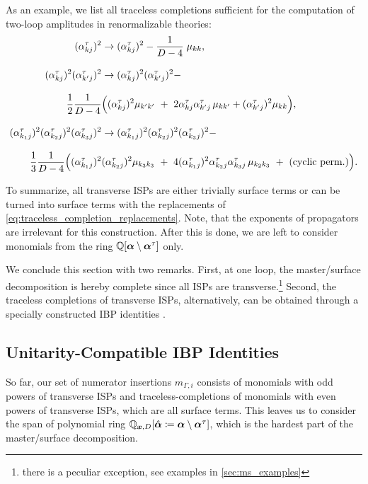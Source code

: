 As an example, we list all traceless completions sufficient for the computation of two-loop amplitudes in renormalizable theories:
\begin{equation}
  \label{eq:traceless_completion_replacements}
  \addtolength{\jot}{2ex}
  \begin{aligned}
    (\alpha_{kj}^{\tau})^2 &\to (\alpha_{kj}^{\tau})^2 - \frac{1}{D-4}\;\mu_{kk}, \\
    (\alpha_{kj}^{\tau})^2(\alpha_{k^\prime j}^{\tau})^2 &\to (\alpha_{kj}^{\tau})^2(\alpha_{k^\prime j}^{\tau})^2 - \\
    \frac{1}{2} \frac{1}{D-4} &
    \qty\Big(
    (\alpha_{kj}^{\tau})^2 \mu_{k^\prime k^\prime} ~+~ 2 \alpha_{kj}^{\tau}\alpha_{k^\prime j}^{\tau} \, \mu_{k k^\prime} + (\alpha_{k^\prime j}^{\tau})^2 \mu_{k k}
    ), \\ 
    (\alpha_{k_1j}^{\tau})^2(\alpha_{k_2 j}^{\tau})^2 (\alpha_{k_3 j}^{\tau})^2&\to (\alpha_{k_1j}^{\tau})^2(\alpha_{k_2 j}^{\tau})^2 (\alpha_{k_3 j}^{\tau})^2 - \\ 
    \frac{1}{3}\frac{1}{D-4} 
    \Big(
    (\alpha_{k_1j}^{\tau})^2 &(\alpha_{k_2j}^{\tau})^2 \mu_{k_3 k_3} ~+~ 4 (\alpha_{k_1j}^{\tau})^2 \alpha_{k_2j}^{\tau} \alpha_{k_3j}^{\tau}\,\mu_{k_2 k_3} ~+~(\text{cyclic perm.})
    \Big).
  \end{aligned}
\end{equation}

To summarize, all transverse ISPs are either trivially surface terms or can be turned into surface terms with the replacements of \cref{eq:traceless_completion_replacements}.
Note, that the exponents of propagators are irrelevant for this construction.
After this is done, we are left to consider monomials from the ring $\mathbb{Q}[\vb*{\alpha}\setminus\vb*{\alpha}^\tau]$ only.


We conclude this section with two remarks.
First, at one loop, the master/surface decomposition is hereby complete since all ISPs are transverse.\footnote{%
  there is a peculiar exception, see examples in \cref{sec:ms_examples}
}
Second, the traceless completions of transverse ISPs, alternatively,
can be obtained through a specially constructed IBP identities \cite{Ita:2015tya}.



\subsection{Unitarity-Compatible IBP Identities}
\label{sec:unitarity_compatible_ibps}
So far, our set of numerator insertions $m_{\Gamma,i}$ consists of monomials with odd powers of transverse ISPs and traceless-completions of
monomials with even powers of transverse ISPs, which are all surface terms.
This leaves us to consider the span of polynomial ring $\mathbb{Q}_{\vb*{x},D}[\hat{\vb*{\alpha}}\coloneqq \vb*{\alpha}\setminus\vb*{\alpha}^\tau]$,
which is the hardest part of the master/surface decomposition.

